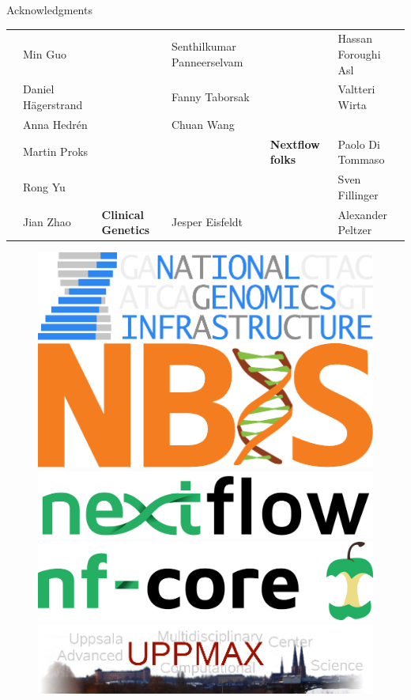 \documentclass[usepdftitle=false]{beamer}
\begin{document}
\begin{frame}{Acknowledgments}
\begin{table}
{\begin{tabular}{llllll}
													&	Min Guo							&														&	Senthilkumar Panneerselvam	&															&	Hassan Foroughi Asl\\
													&	Daniel Hägerstrand	&														&	Fanny Taborsak							&															&	Valtteri Wirta\\
													&	Anna Hedrén					&														&	Chuan Wang									&															&	\\
													&	Martin Proks				&									&							&	\textbf{Nextflow folks}	&	Paolo Di Tommaso	\\
													&	Rong Yu							&									&							&													&	Sven Fillinger	\\
													&	Jian Zhao						&	\textbf{Clinical Genetics}		&	Jesper Eisfeldt			&		&	Alexander Peltzer	\\
		\end{tabular}}
	\end{table}
	\begin{figure}
		\includegraphics[height=.5cm]{pictures/NGI}%
		\hfill%
		\includegraphics[height=.5cm]{pictures/NBIS-orange}%
		\hfill%
		\includegraphics[height=.5cm]{pictures/nextflow.png}%
		\hfill%
		\includegraphics[height=.5cm]{pictures/nf-core}%
		\hfill%
		\includegraphics[height=.5cm]{pictures/uppmax.png}%
	\end{figure}
\end{frame}
\end{document}
